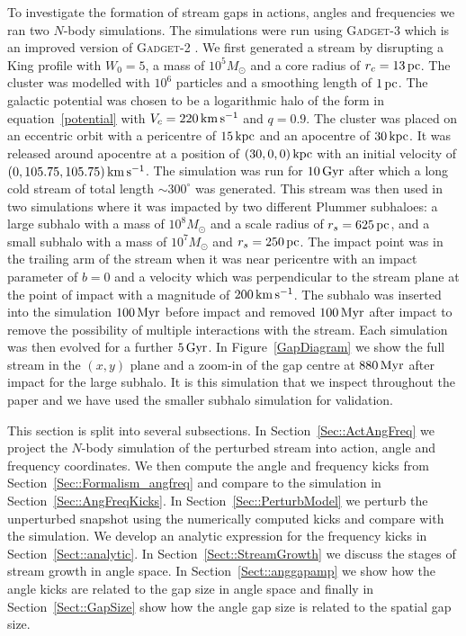 \documentclass[useAMS,usenatbib,fleqn,a4paper]{mn2e}
\def\kpc{\,{\rm kpc}}
\def\pc{\,{\rm pc}}
\def\kms{\,{\rm km\,s^{-1}}}
\def\Gyr{\,{\rm Gyr}}
\def\Myr{\,{\rm Myr}}
\begin{document}
To investigate the formation of stream gaps in actions, angles and frequencies we ran two $N$-body simulations. The simulations were run using \textsc{Gadget-3} which is an improved version of \textsc{Gadget-2} \citep{Gadget2}. We first generated a stream by disrupting a King profile with $W_0=5$, a mass of $10^5 M_\odot$ and a core radius of $r_c=13\pc$. The cluster was modelled with $10^6$ particles and a smoothing length of $1\pc$.
The galactic potential was chosen to be a logarithmic halo of the form in equation~\eqref{potential} with $V_c = 220\kms$ and $q = 0.9$. The cluster was placed on an eccentric orbit with a pericentre of $15\kpc$ and an apocentre of $30\kpc$. It was released around apocentre at a position of $(30,0,0)\kpc$ with an initial velocity of $(0, 105.75, 105.75)\kms$. The simulation was run for $10\Gyr$ after which a long cold stream of total length $\sim 300^\circ$ was generated. This stream was then used in two simulations where it was impacted by two different Plummer subhaloes: a large subhalo with a mass of $10^8 M_\odot$ and a scale radius of $r_s = 625 \pc$, and a small subhalo with a mass of $10^7 M_\odot$ and $r_s = 250 \pc$. The impact point was in the trailing arm of the stream when it was near pericentre with an impact parameter of $b=0$ and a velocity which was perpendicular to the stream plane at the point of impact with a magnitude of $200\kms$. The subhalo was inserted into the simulation $100\Myr$ before impact and removed $100\Myr$ after impact to remove the possibility of multiple interactions with the stream. Each simulation was then evolved for a further $5\Gyr$.  In Figure~\ref{GapDiagram} we show the full stream in the $(x,y)$ plane and a zoom-in of the gap centre at $880\Myr$ after impact for the large subhalo. It is this simulation that we inspect throughout the paper and we have used the smaller subhalo simulation for validation.

This section is split into several subsections. In Section~\ref{Sec::ActAngFreq} we project the $N$-body simulation of the perturbed stream into action, angle and frequency coordinates. We then compute the angle and frequency kicks from Section~\ref{Sec::Formalism_angfreq} and compare to the simulation in Section~\ref{Sec::AngFreqKicks}. In Section~\ref{Sec::PerturbModel} we perturb the unperturbed snapshot using the numerically computed kicks and compare with the simulation. We develop an analytic expression for the frequency kicks in Section~\ref{Sect::analytic}. In Section~\ref{Sect::StreamGrowth} we discuss the stages of stream growth in angle space. In Section~\ref{Sect::anggapamp} we show how the angle kicks are related to the gap size in angle space and finally in Section~\ref{Sect::GapSize} show how the angle gap size is related to the spatial gap size.
\end{document}
